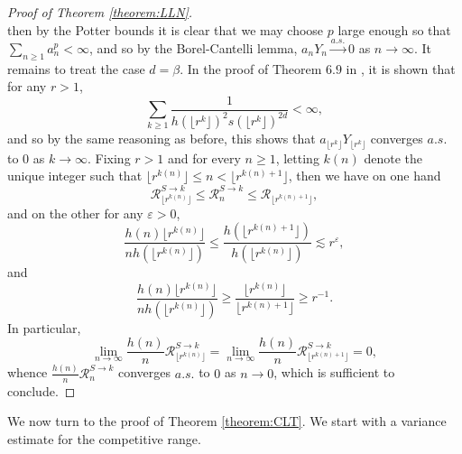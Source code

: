 \documentclass[12pt]{article}
\newcommand{\R}{\mathcal R}
\newcommand{\1}{\mathds{1}}
\numberwithin{equation}{section}
\begin{document}
\begin{proof}[Proof of Theorem \ref{theorem:LLN}]
\begin{equation*}
\end{equation*}
then by the Potter bounds it is clear that we may choose $p$ large enough so that $\sum_{n\ge1}a_n^p<\infty$, and so by the Borel-Cantelli lemma, $a_nY_n\overset{a.s.}\longrightarrow0$ as $n\rightarrow\infty$. It remains to treat the case $d=\beta$. In the proof of Theorem $6.9$ in \cite{LeGallRosenRangeOfStableRandomWalks1991}, it is shown that for any $r>1$, 
\begin{equation*}
    \sum_{k\ge1}\frac{1}{h(\lfloor r^k\rfloor)^2s(\lfloor r^k\rfloor)^{2d}}<\infty,
\end{equation*}
and so by the same reasoning as before, this shows that $a_{\lfloor r^k\rfloor}Y_{\lfloor r^k\rfloor}$ converges $a.s.$ to $0$ as $k\rightarrow\infty$. Fixing $r>1$ and for every $n\ge1$, letting $k(n)$ denote the unique integer such that $\lfloor r^{k(n)}\rfloor\le n<\lfloor r^{k(n)+1}\rfloor$, then we have on one hand 
\begin{equation*}
    \R_{\lfloor r^{k(n)}\rfloor}^{S\rightarrow k}\le\R_n^{S\rightarrow k}\le\R_{\lfloor r^{k(n)+1}\rfloor},
\end{equation*}
and on the other for any $\varepsilon>0$,
\begin{equation*}
    \frac{h(n)\lfloor r^{k(n)}\rfloor}{nh(\lfloor r^{k(n)}\rfloor)}\le \frac{h(\lfloor r^{k(n)+1}\rfloor)}{h(\lfloor r^{k(n)}\rfloor)}\lesssim r^{\varepsilon},
\end{equation*}
and
\begin{equation*}
    \frac{h(n)\lfloor r^{k(n)}\rfloor}{nh(\lfloor r^{k(n)}\rfloor)}\ge\frac{\lfloor r^{k(n)}\rfloor}{\lfloor r^{k(n)+1}\rfloor}\ge r^{-1}.
\end{equation*}
In particular, 
\begin{equation*}
    \lim_{n\rightarrow\infty}\frac{h(n)}{n}\R_{\lfloor r^{k(n)}\rfloor}^{S\rightarrow k}=\lim_{n\rightarrow\infty}\frac{h(n)}{n}\R_{\lfloor r^{k(n)+1}\rfloor}^{S\rightarrow k}=0,
\end{equation*}
whence $\frac{h(n)}{n}\R_n^{S\rightarrow k}$ converges $a.s.$ to $0$ as $n\rightarrow0$, which is sufficient to conclude.
\end{proof}

We now turn to the proof of Theorem \ref{theorem:CLT}. We start with a variance estimate for the competitive range.
\end{document}
